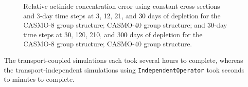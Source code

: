 \begin{figure}[htpb]
{            \label{fig:actinides-error-casmo40-xs-days}
        }
        \caption[]{Relative actinide concentration error using constant cross
                sections and 3-day time steps at 3, 12, 21, and 30 days of
                depletion for the
             CASMO-8 group
                structure;
             CASMO-40 group
                structure;
            and 30-day time steps at 30, 120, 210, and 300 days of
                depletion for the
             CASMO-8 group
                structure;
             CASMO-40
            group structure.}
    \end{figure}

    The transport-coupled simulations each took several hours to complete,
    whereas the transport-independent simulations using
    \verb.IndependentOperator. took seconds to minutes to complete.
